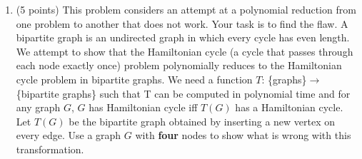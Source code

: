 \documentclass[11pt]{article}
\begin{document}
\begin{enumerate}
\item (5 points) This problem considers an attempt at a polynomial reduction from one problem to another that does not work. Your task is to find the flaw. 
A bipartite graph is an undirected graph in which every cycle has even length. We attempt to show that the Hamiltonian cycle (a cycle that passes through each node exactly once) problem polynomially reduces to the Hamiltonian cycle problem in bipartite graphs. We need a function $T$: 
\{graphs\}$\rightarrow$\{bipartite graphs\} such that T can be computed in polynomial time and for any graph $G$, $G$ has Hamiltonian cycle iff $T(G)$ has a Hamiltonian cycle. Let $T(G)$ be the bipartite graph obtained by inserting a new vertex on every edge. Use a graph $G$ with {\bf four} nodes to show what is wrong with this transformation.\newline 
\begin{right}
\end{right}


\end{enumerate}
\end{document}
